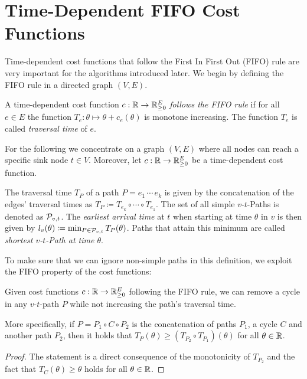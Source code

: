 \section{Time-Dependent FIFO Cost Functions}

Time-dependent cost functions that follow the First In First Out (FIFO) rule are very important for the algorithms introduced later.
We begin by defining the FIFO rule in a directed graph $(V, E)$.


\begin{definition}
    A time-dependent cost function $c: \mathbb{R}\rightarrow \mathbb{R}_{\geq0}^E$ \emph{follows the FIFO rule} if for all $e\in E$ the function $T_e: \theta\mapsto \theta + c_e(\theta)$ is monotone increasing.
    The function $T_e$ is called \emph{traversal time} of $e$.
\end{definition}

For the following we concentrate on a graph $(V,E)$ where all nodes can reach a specific sink node $t\in V$.
Moreover, let $c:\mathbb{R}\rightarrow \mathbb{R}_{\geq0}^E$ be a time-dependent cost function.

The traversal time $T_P$ of a path $P = e_1\,\cdots\,e_k$ is given by the concatenation of the edges' traversal times as $T_P \coloneqq T_{e_k} \circ \cdots \circ T_{e_1}$.
The set of all simple $v$-$t$-Paths is denoted as $\mathcal{P}_{v,t}$.
The \emph{earliest arrival time} at $t$ when starting at time $\theta$ in $v$ is then given by $l_v(\theta)\coloneqq \min_{P\in\mathcal{P}_{v,t}} T_P(\theta)$.
Paths that attain this minimum are called \emph{shortest $v$-$t$-Path at time $\theta$}.

To make sure that we can ignore non-simple paths in this definition, we exploit the FIFO property of the cost functions:

\begin{proposition}\label{prop:removing-cycles-in-fifo-graphs}
    Given cost functions $c:\mathbb{R}\rightarrow\mathbb{R}_{\geq0}^E$ following the FIFO rule, we can remove a cycle in any $v$-$t$-path $P$ while not increasing the path's traversal time.

    More specifically, if $P=P_1\circ C \circ P_2$ is the concatenation of paths $P_1$, a cycle $C$ and another path $P_2$, then it holds that $
        T_P(\theta) \geq \left(
        T_{P_2} \circ T_{P_1} \right)(\theta)$ for all $\theta\in\mathbb{R}$.
\end{proposition}
\begin{proof}
The statement is a direct consequence of the monotonicity of $T_{P_2}$ and the fact that $T_C(\theta) \geq \theta$ holds for all $\theta\in\mathbb{R}$.
\end{proof}


